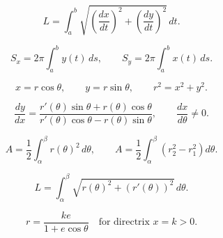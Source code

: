 \[
  L=\int_a^b\sqrt{\left(\frac{dx}{dt}\right)^2+\left(\frac{dy}{dt}\right)^2}\,dt.
\]

\[
  S_x=2\pi\int_a^b y(t)\,ds,
  \qquad
  S_y=2\pi\int_a^b x(t)\,ds.
\]

\[
  x=r\cos\theta,
  \qquad
  y=r\sin\theta,
  \qquad
  r^2=x^2+y^2.
\]

\[
  \frac{dy}{dx}
  =
  \frac{r'(\theta)\sin\theta+r(\theta)\cos\theta}
       {r'(\theta)\cos\theta-r(\theta)\sin\theta},
  \qquad
  \frac{dx}{d\theta}\ne0.
\]

\[
  A=\frac12\int_\alpha^\beta r(\theta)^2\,d\theta,
  \qquad
  A=\frac12\int_\alpha^\beta\left(r_2^2-r_1^2\right)d\theta.
\]

\[
  L=\int_\alpha^\beta
  \sqrt{r(\theta)^2+\left(r'(\theta)\right)^2}\,d\theta.
\]

\[
  r=\frac{ke}{1+e\cos\theta}
  \quad
  \text{for directrix }x=k>0.
\]
